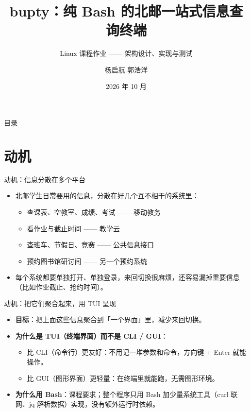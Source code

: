 \documentclass[aspectratio=169]{beamer}
\title{bupty：纯 Bash 的北邮一站式信息查询终端}
\subtitle{Linux 课程作业 —— 架构设计、实现与测试}
\author{杨启航 \quad 郭浩洋}
\institute{累计 39 次提交}
\date{2026 年 10 月}
\begin{document}
\begin{frame}
  \titlepage
\end{frame}

\begin{frame}{目录}
  \tableofcontents
\end{frame}

\section{动机}

\begin{frame}{动机：信息分散在多个平台}
  \begin{itemize}
    \setlength\itemsep{0.9em}
    \item 北邮学生日常要用的信息，分散在好几个互不相干的系统里：
      \begin{itemize}
        \item 查课表、空教室、成绩、考试 —— 移动教务
        \item 看作业与截止时间 —— 教学云
        \item 查班车、节假日、竞赛 —— 公共信息接口
        \item 预约图书馆研讨间 —— 另一个预约系统
      \end{itemize}
    \item 每个系统都要单独打开、单独登录，来回切换很麻烦，还容易漏掉重要信息（比如作业截止、抢约时间）。
  \end{itemize}
\end{frame}

\begin{frame}{动机：把它们聚合起来，用 TUI 呈现}
  \begin{itemize}
    \setlength\itemsep{0.9em}
    \item \textbf{目标}：把上面这些信息聚合到「一个界面」里，减少来回切换。
    \item \textbf{为什么是 TUI（终端界面）而不是 CLI / GUI}：
      \begin{itemize}
        \item 比 CLI（命令行）更友好：不用记一堆参数和命令，方向键 + Enter 就能操作。
        \item 比 GUI（图形界面）更轻量：在终端里就能跑，无需图形环境。
      \end{itemize}
    \item \textbf{为什么用 Bash}：课程要求；整个程序只用 Bash 加少量系统工具（curl 联网、jq 解析数据）实现，没有额外运行时依赖。
  \end{itemize}
\end{frame}
\end{document}
